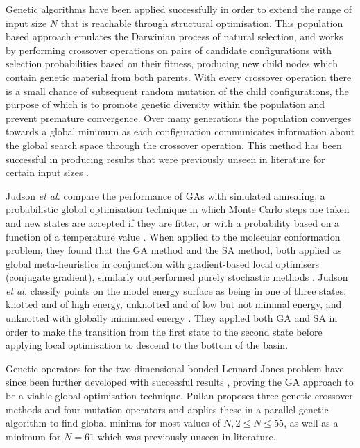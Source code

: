 \documentclass{article}
\begin{document}
Genetic algorithms have been applied \cite{doi:10.1002/qua.560440214,
PULLAN1998331, } successfully in order to extend the range of input size $N$
that is reachable through structural optimisation. This population based
approach emulates the Darwinian process of natural selection, and works by
performing crossover operations on pairs of candidate configurations with
selection probabilities based on their fitness, producing new child nodes which
contain genetic material from both parents. With every crossover operation there
is a small chance of subsequent random mutation of the child configurations, the
purpose of which is to promote genetic diversity within the population and
prevent premature convergence. Over many generations the population converges
towards a global minimum as each configuration communicates information about
the global search space through the crossover operation. This method has been
successful in producing results that were previously unseen in literature for
certain input sizes \cite{PULLAN1998331}.

Judson \textit{et al.} compare the performance of GAs with simulated annealing,
a probabilistic global optimisation technique in which Monte Carlo steps are
taken and new states are accepted if they are fitter, or with a probability
based on a function of a temperature value \cite{doi:10.1002/qua.560440214}.
When applied to the molecular conformation problem, they found that the GA
method and the SA method, both applied as global meta-heuristics in conjunction
with gradient-based local optimisers (conjugate gradient), similarly
outperformed purely stochastic methods \cite{doi:10.1002/qua.560440214}. Judson
\textit{et al.} classify points on the model energy surface as being in one of
three states: knotted and of high energy, unknotted and of low but not minimal
energy, and unknotted with globally minimised energy
\cite{doi:10.1002/qua.560440214}. They applied both GA and SA in order to make
the transition from the first state to the second state before applying local
optimisation to descend to the bottom of the basin.

Genetic operators for the two dimensional bonded Lennard-Jones problem have
since been further developed with successful results \cite{PULLAN1998331},
proving the GA approach to be a viable global optimisation technique. Pullan
\cite{PULLAN1998331} proposes three genetic crossover methods and four mutation
operators and applies these in a parallel genetic algorithm to find global
minima for most values of $N, 2 \leq N \leq 55$, as well as a minimum for $N =
61$ which was previously unseen in literature.
\end{document}
